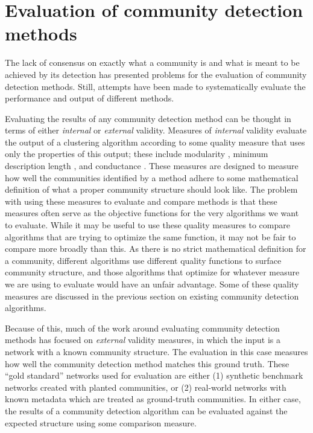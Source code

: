 \section{Evaluation of community detection
methods}\label{evaluation-of-community-detection-methods}

The lack of consensus on exactly what a community is and what is meant
to be achieved by its detection has presented problems for the
evaluation of community detection methods. Still, attempts have been
made to systematically evaluate the performance and output of different
methods.

Evaluating the results of any community detection method can be thought
in terms of either \emph{internal} or \emph{external} validity. Measures
of \emph{internal} validity evaluate the output of a clustering
algorithm according to some quality measure that uses only the
properties of this output; these include modularity
\autocite{newman_finding_2004}, minimum description length
\autocite{rosvall_map_2010}, and conductance
\autocite{leskovec_empirical_2010}. These measures are designed to
measure how well the communities identified by a method adhere to some
mathematical definition of what a proper community structure should look
like. The problem with using these measures to evaluate and compare
methods is that these measures often serve as the objective functions
for the very algorithms we want to evaluate. While it may be useful to
use these quality measures to compare algorithms that are trying to
optimize the same function, it may not be fair to compare more broadly
than this. As there is no strict mathematical definition for a
community, different algorithms use different quality functions to
surface community structure, and those algorithms that optimize for
whatever measure we are using to evaluate would have an unfair
advantage. Some of these quality measures are discussed in the previous
section on existing community detection algorithms.

Because of this, much of the work around evaluating community detection
methods has focused on \emph{external} validity measures, in which the
input is a network with a known community structure. The evaluation in
this case measures how well the community detection method matches this
ground truth. These ``gold standard'' networks used for evaluation are
either (1) synthetic benchmark networks created with planted
communities, or (2) real-world networks with known metadata which are
treated as ground-truth communities. In either case, the results of a
community detection algorithm can be evaluated against the expected
structure using some comparison measure.

